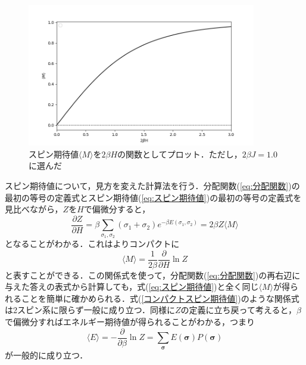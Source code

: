 \documentclass[a4paper,11pt]{jsarticle}
\begin{document}
\begin{figure}[htbp]
  \begin{center}
    \includegraphics[width=100mm]{graph/fukushima(3_140).png}
    \caption{スピン期待値$\langle M \rangle$を$2\beta H$の関数としてプロット．ただし，$2\beta J = 1.0$に選んだ \label{fig:spin_graph} }
  \end{center}
\end{figure}

スピン期待値について，見方を変えた計算法を行う．分配関数(\ref{eq:分配関数})の最初の等号の定義式とスピン期待値(\ref{eq:スピン期待値})の最初の等号の定義式を見比べながら，$Z$を$H$で偏微分すると，
\begin{equation}
  \frac{\partial Z}{\partial H} = \beta \sum_{\sigma_1, \sigma_2}(\sigma_1 + \sigma_2)e^{-\beta E(\sigma_1, \sigma_2)} = 2\beta Z \langle M \rangle
\end{equation}
となることがわかる．これはよりコンパクトに
\begin{equation}
  \langle M \rangle = \frac{1}{2\beta} \frac{\partial}{\partial H} \ln{Z} \label{eq:コンパクトスピン期待値}
\end{equation}
と表すことができる．この関係式を使って，分配関数(\ref{eq:分配関数})の再右辺に与えた答えの表式から計算しても，式(\ref{eq:スピン期待値})と全く同じ$\langle M \rangle$が得られることを簡単に確かめられる．式(\ref{コンパクトスピン期待値})のような関係式は2スピン系に限らず一般に成り立つ．同様に$Z$の定義に立ち戻って考えると，$\beta$で偏微分すればエネルギー期待値が得られることがわかる，つまり
\begin{equation}
  \langle E \rangle = -\frac{\partial}{\partial \beta} \ln{Z} = \sum_{\bm{\sigma}} E(\bm{\sigma}) P(\bm{\sigma})
\end{equation}
が一般的に成り立つ．



\end{document}
